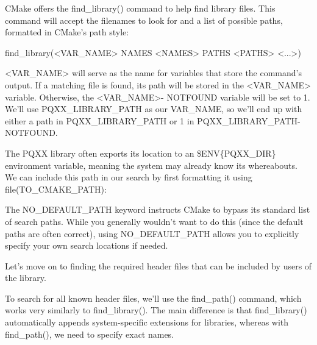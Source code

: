 
CMake offers the find\_library() command to help find library files. This command will accept the filenames to look for and a list of possible paths, formatted in CMake’s path style:

\begin{shell}
find_library(<VAR_NAME> NAMES <NAMES> PATHS <PATHS> <...>)
\end{shell}

<VAR\_NAME> will serve as the name for variables that store the command’s output. If a matching file is found, its path will be stored in the <VAR\_NAME> variable. Otherwise, the <VAR\_NAME>- NOTFOUND variable will be set to 1. We’ll use PQXX\_LIBRARY\_PATH as our VAR\_NAME, so we’ll end up with either a path in PQXX\_LIBRARY\_PATH or 1 in PQXX\_LIBRARY\_PATH-NOTFOUND.

The PQXX library often exports its location to an \$ENV\{PQXX\_DIR\} environment variable, meaning the system may already know its whereabouts. We can include this path in our search by first formatting it using file(TO\_CMAKE\_PATH):



The NO\_DEFAULT\_PATH keyword instructs CMake to bypass its standard list of search paths.
While you generally wouldn’t want to do this (since the default paths are often correct), using NO\_DEFAULT\_PATH allows you to explicitly specify your own search locations if needed.

Let’s move on to finding the required header files that can be included by users of the library.


To search for all known header files, we’ll use the find\_path() command, which works very similarly to find\_library(). The main difference is that find\_library() automatically appends system-specific extensions for libraries, whereas with find\_path(), we need to specify exact names.

